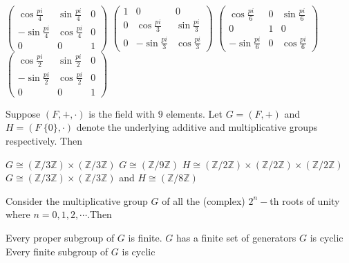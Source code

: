 \documentclass[10pt]{exam}
\newcommand{\Z}{\ensuremath{\mathbb{Z}}}
\begin{document}
\begin{questions}
\begin{choices}
\choice $\begin{pmatrix} \cos \frac{pi}{4} & \sin \frac{pi}{4} & 0 \\ - \sin \frac{pi}{4} & \cos \frac{pi}{4} & 0 \\ 0 & 0 & 1 \end{pmatrix}$
\choice $\begin{pmatrix}1&0&0\\0 &  \cos \frac{pi}{3} & \sin \frac{pi}{3} \\ 0 & -\sin \frac{pi}{3} & \cos \frac{pi}{3}  \end{pmatrix}$
\choice $\begin{pmatrix} \cos \frac{pi}{6} &0& \sin \frac{pi}{6} \\ 0&1&0\\- \sin \frac{pi}{6}& 0 & \cos \frac{pi}{6} \end{pmatrix}$
\choice $\begin{pmatrix} \cos \frac{pi}{2} & \sin \frac{pi}{2} & 0 \\ - \sin \frac{pi}{2} & \cos \frac{pi}{2} & 0 \\ 0 & 0 & 1 \end{pmatrix}$
\end{choices}


\question 
Suppose $(F, +, \cdot)$ is the field with $9$ elements. Let $G = (F, +)$ and $H = (F \ \{0\}, \cdot )$ denote the underlying additive and multiplicative groups respectively. Then 

\begin{checkboxes}
\choice $G \cong (\Z / 3 \Z) \times (\Z / 3 \Z)$
\choice $G \cong (\Z / 9 \Z)$
\choice $H \cong (\Z / 2 \Z) \times (\Z / 2 \Z) \times (\Z / 2 \Z)$
\choice $G \cong (\Z / 3 \Z) \times (\Z / 3 \Z)$ and $H \cong (\Z / 8 \Z)$
\end{checkboxes}
 
\question 
Consider the multiplicative group $G$ of all the (complex) $2^n-$th roots of unity where $n = 0,1,2, \cdots$.Then 

\begin{checkboxes}
\choice Every proper subgroup of $G$ is finite.
\choice $G$ has a finite set of generators 
\choice $G$ is cyclic 
\choice Every finite subgroup of $G$ is cyclic 
\end{checkboxes}
 


\end{questions}
\end{document}
